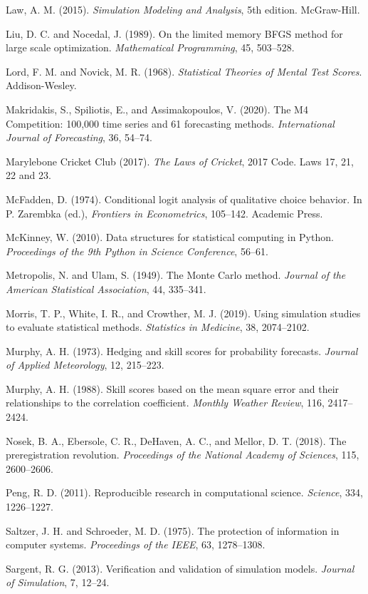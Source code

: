 \documentclass[11pt,letterpaper]{article}
\begin{document}
\begin{footnotesize}
\begin{enumerate}[leftmargin=1.6em, itemsep=1pt, label={[\arabic*]}]
\item Law, A. M. (2015). \emph{Simulation Modeling and Analysis}, 5th edition. McGraw-Hill.
\item Liu, D. C. and Nocedal, J. (1989). On the limited memory BFGS method for large scale optimization. \emph{Mathematical Programming}, 45, 503--528.
\item Lord, F. M. and Novick, M. R. (1968). \emph{Statistical Theories of Mental Test Scores}. Addison-Wesley.
\item Makridakis, S., Spiliotis, E., and Assimakopoulos, V. (2020). The M4 Competition: 100,000 time series and 61 forecasting methods. \emph{International Journal of Forecasting}, 36, 54--74.
\item Marylebone Cricket Club (2017). \emph{The Laws of Cricket}, 2017 Code. Laws 17, 21, 22 and 23.
\item McFadden, D. (1974). Conditional logit analysis of qualitative choice behavior. In P. Zarembka (ed.), \emph{Frontiers in Econometrics}, 105--142. Academic Press.
\item McKinney, W. (2010). Data structures for statistical computing in Python. \emph{Proceedings of the 9th Python in Science Conference}, 56--61.
\item Metropolis, N. and Ulam, S. (1949). The Monte Carlo method. \emph{Journal of the American Statistical Association}, 44, 335--341.
\item Morris, T. P., White, I. R., and Crowther, M. J. (2019). Using simulation studies to evaluate statistical methods. \emph{Statistics in Medicine}, 38, 2074--2102.
\item Murphy, A. H. (1973). Hedging and skill scores for probability forecasts. \emph{Journal of Applied Meteorology}, 12, 215--223.
\item Murphy, A. H. (1988). Skill scores based on the mean square error and their relationships to the correlation coefficient. \emph{Monthly Weather Review}, 116, 2417--2424.
\item Nosek, B. A., Ebersole, C. R., DeHaven, A. C., and Mellor, D. T. (2018). The preregistration revolution. \emph{Proceedings of the National Academy of Sciences}, 115, 2600--2606.
\item Peng, R. D. (2011). Reproducible research in computational science. \emph{Science}, 334, 1226--1227.
\item Saltzer, J. H. and Schroeder, M. D. (1975). The protection of information in computer systems. \emph{Proceedings of the IEEE}, 63, 1278--1308.
\item Sargent, R. G. (2013). Verification and validation of simulation models. \emph{Journal of Simulation}, 7, 12--24.

\end{enumerate}
\end{footnotesize}
\end{document}
